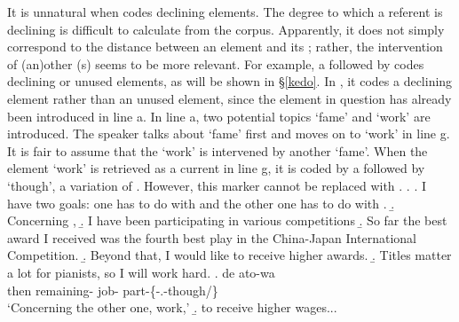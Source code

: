 It is unnatural when  codes declining elements.
The degree to which a referent is declining is difficult to calculate from the corpus.
Apparently, it does not simply correspond to the distance between an element and its ; rather, the intervention of (an)other (s) seems to be more relevant.
For example,
a  followed by  codes declining or unused elements, as will be shown in \S \ref{kedo}.
In \Next[g],
it codes a declining element rather than an unused element, since the element in question has already been introduced in line a.
In line a, two potential topics `fame' and `work' are introduced. The speaker talks about `fame' first and moves on to `work' in line g. It is fair to assume that the  `work' is intervened by another  `fame'. When the element `work' is retrieved as a current  in line g, it is coded by a  followed by  `though', a variation of . However, this marker cannot be replaced with .
\ex.\label{sigoto}
 \a. I have two goals: one has to do with  and the other one has to do with .
 \b. Concerning ,
 \b. I have been participating in various  competitions
 \b. So far the best award I received was the fourth best play in the China-Japan International Competition.
 \b. Beyond that, I would like to receive higher awards.
 \b. Titles matter a lot for pianists, so I will work hard.
 \bg. de ato-wa   \\
 	then remaining- job- part-\{-.-though/\} \\
	`Concerning the other one, work,'
 \b. to receive higher wages...
%
